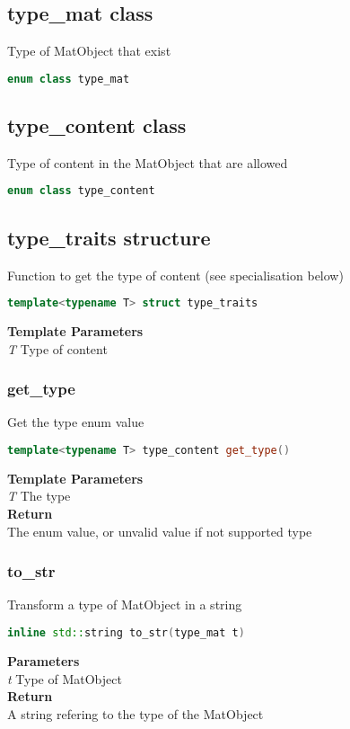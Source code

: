 \subsection{type\_mat  class}
Type of MatObject that exist
\begin{lstlisting}[language=C++]
enum class type_mat 
\end{lstlisting}

\subsection{type\_content  class}
Type of content in the MatObject that are allowed
\begin{lstlisting}[language=C++]
enum class type_content 
\end{lstlisting}

\subsection{type\_traits  structure}
Function to get the type of content (see specialisation below)
\begin{lstlisting}[language=C++]
template<typename T> struct type_traits 
\end{lstlisting}
\textbf{Template Parameters} \\ 
\textit{T} Type of content \\ 

\subsubsection{get\_type}
\begin{mdframed}
Get the type enum value
\begin{lstlisting}[language=C++]
template<typename T> type_content get_type() 
\end{lstlisting}
\textbf{Template Parameters} \\ 
\textit{T} The type \\ 
\textbf{Return} \\ 
The enum value, or unvalid value if not supported type\\ 
\end{mdframed}

\subsubsection{to\_str}
\begin{mdframed}
Transform a type of MatObject in a string
\begin{lstlisting}[language=C++]
inline std::string to_str(type_mat t) 
\end{lstlisting}
\textbf{Parameters} \\ 
\textit{t} Type of MatObject \\ 
\textbf{Return} \\ 
A string refering to the type of the MatObject\\ 
\end{mdframed}

